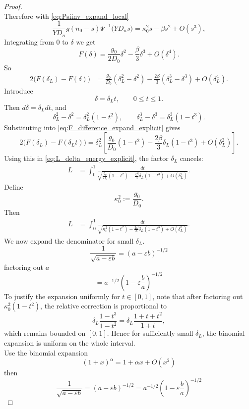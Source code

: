 \documentclass[11pt,a4paper]{report}
\begin{document}
\begin{proof}
\[		\]
		Therefore with \eqref{eq:Psiinv_expand_local}
	\[
	\frac{1}{YD_n}g(n_0-s)\Psi^{-1}\!\bigl(YD_ns\bigr)=\kappa_0^2 s-\beta s^2+O(s^3),
	\]
		Integrating from $0$ to $\delta$ we get
		\begin{equation}
			F(\delta)
			=
			\frac{g_0}{2D_0}\delta^2
			-
			\frac{\beta}{3}\delta^3
			+
			O(\delta^4).
			\label{eq:F_delta_expand_explicit}
		\end{equation}
		So
		\begin{align}
			2\bigl(F(\delta_L)-F(\delta)\bigr)
			&=
			\frac{g_0}{D_0}(\delta_L^2-\delta^2)
			-
			\frac{2\beta}{3}(\delta_L^3-\delta^3)
			+
			O(\delta_L^4).
			\label{eq:F_difference_expand_explicit}
		\end{align}
		Introduce
		\[
		\delta=\delta_L t,
		\qquad
		0\le t\le1.
		\]
		Then $d\delta=\delta_L dt$, and
		\[
		\delta_L^2-\delta^2
		=
		\delta_L^2(1-t^2),
		\qquad
		\delta_L^3-\delta^3
		=
		\delta_L^3(1-t^3).
		\]
		Substituting into \eqref{eq:F_difference_expand_explicit} gives
		\[
		2\bigl(F(\delta_L)-F(\delta_Lt)\bigr)
		=
		\delta_L^2
		\left[
		\frac{g_0}{D_0}(1-t^2)
		-
		\frac{2\beta}{3}\delta_L(1-t^3)
		+
		O(\delta_L^2)
		\right].
		\]
		Using this in \eqref{eq:L_delta_energy_explicit}, the factor
		$\delta_L$ cancels:
		\begin{align}
			L
			&=
			\int_0^1
			\frac{dt}
			{
				\sqrt{
					\frac{g_0}{D_0}(1-t^2)
					-
					\frac{2\beta}{3}\delta_L(1-t^3)
					+
					O(\delta_L^2)
				}
			}.
			\label{eq:L_delta_t_integral_explicit}
		\end{align}
		Define
		\begin{equation}
			\kappa_0^2:=\frac{g_0}{D_0}.
			\label{eq:kappa0_explicit}
		\end{equation}
		Then
		\begin{align}
			L
			&=
			\int_0^1
			\frac{dt}
			{
				\sqrt{
					\kappa_0^2(1-t^2)
					-
					\frac{2\beta}{3}\delta_L(1-t^3)
					+
					O(\delta_L^2)
				}
			}.
			\label{eq:L_delta_before_expansion}
		\end{align}	
		We now expand the denominator for small $\delta_L$.  
		\[
		\frac{1}{\sqrt{a-\varepsilon b}}
		= (a-\varepsilon b)^{-1/2}
		\]
		factoring out $a$
		\[
		= a^{-1/2}\left(1-\varepsilon \frac{b}{a}\right)^{-1/2}
		\]
		To justify the expansion uniformly for $t\in[0,1]$, note that after factoring
		out $\kappa_0^2(1-t^2)$, the relative correction is proportional to
		\[
		\delta_L\frac{1-t^3}{1-t^2}
		=
		\delta_L\frac{1+t+t^2}{1+t},
		\]
		which remains bounded on $[0,1]$. Hence for sufficiently small $\delta_L$,
		the binomial expansion is uniform on the whole interval.\\
		Use the binomial expansion
		\[
		(1+x)^\alpha = 1+\alpha x + O(x^2)
		\]
		then
		\[
		\frac{1}{\sqrt{a-\varepsilon b}}
		= (a-\varepsilon b)^{-1/2}
		= a^{-1/2}\left(1-\varepsilon \frac{b}{a}\right)^{-1/2}
		\]
		

\end{proof}
\end{document}
